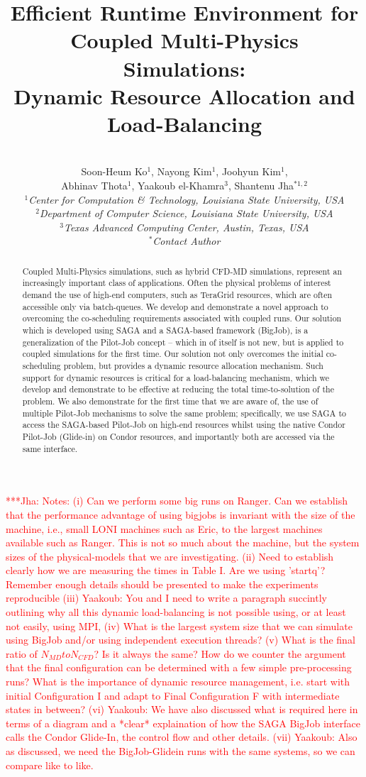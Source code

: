 \documentclass[conference,final]{IEEEtran}
\title{Efficient Runtime Environment for Coupled Multi-Physics Simulations: \\
Dynamic Resource Allocation and Load-Balancing}
\author{
 ~\\[-2em]
 Soon-Heum Ko$^{1}$, Nayong Kim$^{1}$, Joohyun Kim$^{1}$, \\ Abhinav Thota$^{1}$, Yaakoub el-Khamra$^{3}$, Shantenu Jha$^{*1,2}$\\
 \small{\emph{$^{1}$Center for Computation \& Technology, Louisiana State University, USA}}\\
 \small{\emph{$^{2}$Department of Computer Science, Louisiana State University, USA}}\\
 \small{\emph{$^{3}$Texas Advanced Computing Center, Austin, Texas, USA}}\\
 \small{\emph{$^{*}$Contact Author}}\\
}
\newcommand{\jhanote}[1]{ {\textcolor{red} { ***Jha: #1 }}}
\newcommand{\jhanote}[1]{}
\newcommand{\up}{\vspace*{-1em}}
\begin{document}
\maketitle

\begin{abstract}
 Coupled Multi-Physics simulations, such as hybrid CFD-MD simulations, represent an increasingly important class of applications.  Often the physical problems of interest demand the use of high-end computers, such as TeraGrid resources, which are often accessible only via batch-queues.  We develop and demonstrate a novel approach to overcoming the co-scheduling requirements associated with coupled runs.  Our solution which is developed using SAGA and a SAGA-based framework (BigJob), is a generalization of the Pilot-Job concept -- which in of itself is not new, but is applied to coupled simulations for the first time.  Our solution not only overcomes the initial co-scheduling problem, but provides a dynamic resource allocation mechanism. Such support for dynamic resources is critical for a load-balancing mechanism, which we develop and demonstrate to be effective at reducing the total time-to-solution of the problem.  We also demonstrate for the first time that we are aware of, the use of multiple Pilot-Job mechanisms to solve the same problem; specifically, we use SAGA to access the SAGA-based Pilot-Job on high-end resources whilst using the native Condor Pilot-Job (Glide-in) on Condor resources, and importantly both are accessed via the same interface.
\end{abstract}
\up\up 

\jhanote{Notes: (i) Can we perform some big runs on Ranger. Can we establish that the performance advantage of using bigjobs is invariant with the size of the machine, i.e., small LONI machines such as Eric, to the largest machines available such as Ranger. This is not so much about the machine, but the system sizes of the physical-models that we are investigating. (ii) Need to establish clearly how we are measuring the times in Table I. Are we using 'startq'? Remember enough details should be presented to make the experiments reproducible (iii) Yaakoub: You and I need to write a paragraph succintly outlining why all this dynamic load-balancing is not possible using, or at least not easily, using MPI, (iv) What is the largest system size that we can simulate using BigJob and/or using independent execution threads? (v) What is the final ratio of $N_{MD} to N_{CFD}$? Is it always the same? How do we counter the argument that the final configuration can be determined with a few simple pre-processing runs? What is the importance of dynamic resource management, i.e. start with initial Configuration I and adapt to Final Configuration F with intermediate states in between? (vi) Yaakoub: We have also discussed what is required here in terms of a diagram and a *clear* explaination of how the SAGA BigJob interface calls the Condor Glide-In, the control flow and other details.  (vii) Yaakoub: Also as discussed, we need the BigJob-Glidein runs with the same systems, so we can compare like to like.}
\end{document}
